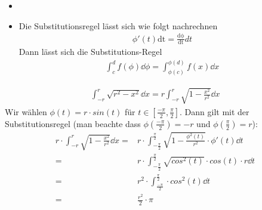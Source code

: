\begin{Bemerkung}{
	\begin{itemize}
		\item[ ]
		\item Die Substitutionsregel lässt sich wie folgt nachrechnen
		\begin{align*}
			\phi'(t)\mathrm{dt} = \frac{\mathrm{d\phi}}{\mathrm{dt}}dt
		\end{align*}
		Dann lässt sich die Substitutions-Regel
		\begin{align*}
			\int_c^d f(\phi) \dd{\phi} = \int_{\phi(c)}^{\phi(d)} f(x) \dd{x}
		\end{align*}
	\end{itemize}
}\end{Bemerkung}

\begin{Beispiel}{
	\begin{align*}
		\int_{-r}^r \sqrt{r^2 -x^2} \dd{x} = r \int_{-r}^r 
		\sqrt{1 - \frac{x^2}{r^2}} \dd{x}
	\end{align*}
	Wir wählen $\phi(t) = r \cdot sin(t)$ für $ t \in [\frac{-\pi}{2}, \frac{\pi}{2}]$. 
	Dann gilt mit der Substitutionsregel 
	(man beachte dass $\phi(\frac{-\pi}{2}) = -r 
	$ und $\phi(\frac{\pi}{2}) = r$):
	\begin{align*}
		r \cdot \int_{-r}^r \sqrt{1 - \frac{x^2}{r^2}} \dd{x} = & r 
			\cdot \int_{-\frac{\pi}{2}}^{\frac{\pi}{2}} 
			\sqrt{1 - \frac{\phi^2(t)}{r^2}} \cdot \phi'(t) \dd{t} \\
		= & r \cdot \int_{-\frac{\pi}{2}}^{\frac{\pi}{2}} 
			\sqrt{cos^2(t)} \cdot cos(t) \cdot r\dd{t} \\
		= & r^2 \cdot \int_{\frac{-\pi}{2}}^{\frac{\pi}{2}} \cdot cos^2(t)\dd{t} \\
		= & \frac{r^2}{2} \cdot \pi
	\end{align*}	 
}\end{Beispiel}

